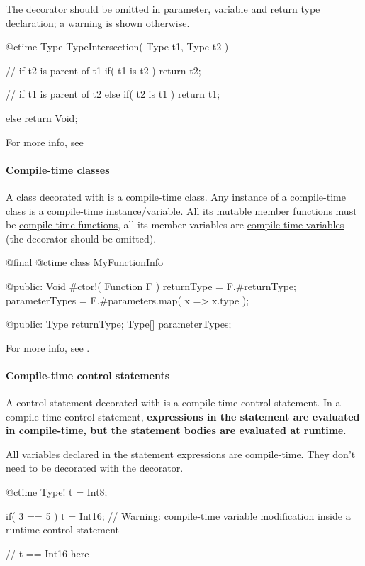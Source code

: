 The  decorator should be omitted in parameter, variable and return type declaration; a warning is shown otherwise.

\begin{code}
@ctime Type TypeIntersection( Type t1, Type t2 ) {
	// if t2 is parent of t1
	if( t1 is t2 )
		return t2;
		
	// if t1 is parent of t2
	else if( t2 is t1 )
		return t1;
	
	else
		return Void;
}
\end{code}

For more info, see 

\paragraph{Compile-time classes}
A class decorated with  is a compile-time class. Any instance of a compile-time class is a compile-time instance/variable. All its mutable member functions must be \hyperref[ctime:function]{compile-time functions}, all its member variables are \hyperref[ctime:variable]{compile-time variables} (the  decorator should be omitted).

\begin{code}
@final @ctime class MyFunctionInfo {

@public:
	Void #ctor!( Function F ) {
		returnType = F.#returnType;
		parameterTypes = F.#parameters.map( x => x.type );
	}
	
@public:
	Type returnType;
	Type[] parameterTypes;	
	
}
\end{code}

For more info, see .

\paragraph{Compile-time control statements}
A control statement decorated with  is a compile-time control statement. In a compile-time control statement, \textbf{expressions in the statement are evaluated in compile-time, but the statement bodies are evaluated at runtime}.

All variables declared in the statement expressions are compile-time. They don't need to be decorated with the  decorator.

\begin{code}
@ctime Type! t = Int8;

if( 3 == 5 )
	t = Int16; // Warning: compile-time variable modification inside a runtime control statement

// t == Int16 here
\end{code}

